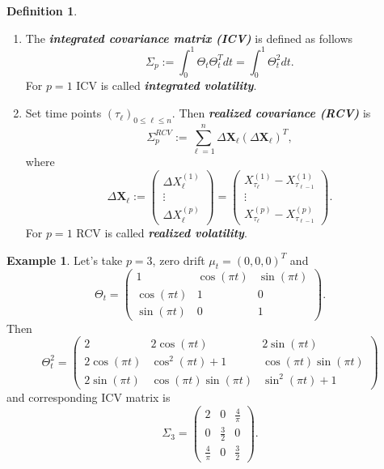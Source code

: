 \documentclass[a4paper,11pt]{article}
\theoremstyle{plain}
\theoremstyle{definition}
\newtheorem{defn}[thm]{Definition}
\newtheorem{exmp}[thm]{Example}
\newcommand{\define}[1]{\textit{\textbf{#1}}}
\begin{document}
	\begin{defn} \
		\begin{enumerate}
			\item The \define{integrated covariance matrix (ICV)} is defined as follows
			\[\Sigma_p := \int_0^1\Theta_t \Theta_t^T dt = \int_0^1\Theta_t^2 dt.\]
			For $p=1$ ICV is called \define{integrated volatility}.
			\item Set time points $(\tau_{\ell})_{0 \leq \ell \leq n}$. Then \define{realized covariance (RCV)} is
			\begin{equation} \label{RCV}
				\Sigma_p^{RCV} := \sum_{\ell=1}^{n}\Delta \mathbf{X}_\ell(\Delta \mathbf{X}_\ell)^T,
			\end{equation}
			where 
			\[ \Delta \mathbf{X}_\ell :=
			\begin{pmatrix}
			\Delta X_\ell^{(1)} \\
			\vdots \\
			\Delta X_\ell^{(p)}
			\end{pmatrix}
			=
			\begin{pmatrix}
			X_{\tau_{\ell}}^{(1)} - X_{\tau_{\ell-1}}^{(1)} \\
			\vdots \\
			X_{\tau_{\ell}}^{(p)} - X_{\tau_{\ell-1}}^{(p)}
			\end{pmatrix}. \]
			For $p=1$ RCV is called \define{realized volatility}.
		\end{enumerate}
	\end{defn}
	
	\begin{exmp} \label{exmp X3}
		Let's take $p = 3$, zero drift $\mu_t = (0, 0, 0)^T$ and 
		\[ \Theta_t = \begin{pmatrix}
		1 & \cos(\pi t) & \sin (\pi t) \\
		\cos(\pi t) & 1 & 0 \\
		\sin (\pi t) & 0 & 1
		\end{pmatrix}. \]
		Then 
		\[ \Theta_t^2 = \begin{pmatrix}
		2 & 2\cos(\pi t) & 2\sin (\pi t) \\
		2\cos(\pi t) & \cos^2(\pi t) + 1 & \cos(\pi t)\sin(\pi t) \\
		2\sin (\pi t) & \cos(\pi t)\sin(\pi t) & \sin^2(\pi t)+1
		\end{pmatrix} \]
		and corresponding ICV matrix is
		\[ \Sigma_3 = \begin{pmatrix}
		2 & 0 & \frac{4}{\pi} \\
		0 & \frac{3}{2} & 0 \\
		\frac{4}{\pi} & 0 & \frac{3}{2}
		\end{pmatrix}. \]
	\end{exmp}
	
\end{document}
